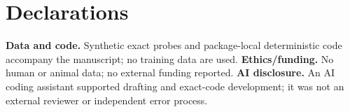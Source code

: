 \documentclass[9pt]{extarticle}
\begin{document}
\section*{Declarations}
\textbf{Data and code.} Synthetic exact probes and package-local deterministic
code accompany the manuscript; no training data are used.\quad
\textbf{Ethics/funding.} No human or animal data; no external funding reported.\quad
\textbf{AI disclosure.} An AI coding assistant supported drafting and exact-code
development; it was not an external reviewer or independent error process.
\end{document}
